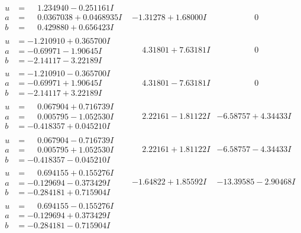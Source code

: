\documentclass[1p]{elsarticle_modified}
\theoremstyle{definition}
\begin{document}
$$\begin{array}{c|c|c}
\begin{aligned}
u &= \phantom{-}1.234940 - 0.251161 I \\
a &= \phantom{-}0.0367038 + 0.0468935 I \\
b &= \phantom{-}0.429880 + 0.656423 I\end{aligned}
 & -1.31278 + 1.68000 I & \phantom{-0.000000 } 0 \\ \hline\begin{aligned}
u &= -1.210910 + 0.365700 I \\
a &= -0.69971 - 1.90645 I \\
b &= -2.14117 - 3.22189 I\end{aligned}
 & \phantom{-}4.31801 + 7.63181 I & \phantom{-0.000000 } 0 \\ \hline\begin{aligned}
u &= -1.210910 - 0.365700 I \\
a &= -0.69971 + 1.90645 I \\
b &= -2.14117 + 3.22189 I\end{aligned}
 & \phantom{-}4.31801 - 7.63181 I & \phantom{-0.000000 } 0 \\ \hline\begin{aligned}
u &= \phantom{-}0.067904 + 0.716739 I \\
a &= \phantom{-}0.005795 - 1.052530 I \\
b &= -0.418357 + 0.045210 I\end{aligned}
 & \phantom{-}2.22161 - 1.81122 I & -6.58757 + 4.34433 I \\ \hline\begin{aligned}
u &= \phantom{-}0.067904 - 0.716739 I \\
a &= \phantom{-}0.005795 + 1.052530 I \\
b &= -0.418357 - 0.045210 I\end{aligned}
 & \phantom{-}2.22161 + 1.81122 I & -6.58757 - 4.34433 I \\ \hline\begin{aligned}
u &= \phantom{-}0.694155 + 0.155276 I \\
a &= -0.129694 - 0.373429 I \\
b &= -0.284181 + 0.715904 I\end{aligned}
 & -1.64822 + 1.85592 I & -13.39585 - 2.90468 I \\ \hline\begin{aligned}
u &= \phantom{-}0.694155 - 0.155276 I \\
a &= -0.129694 + 0.373429 I \\
b &= -0.284181 - 0.715904 I\end{aligned}

\end{array}$$
\end{document}
